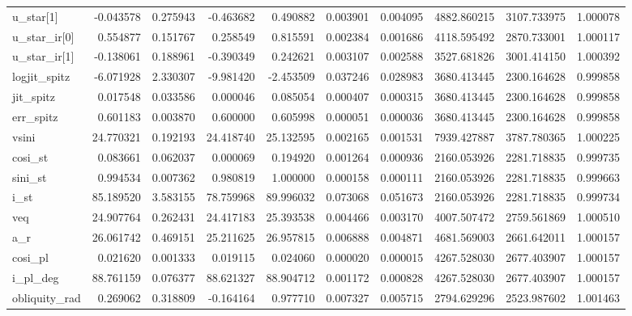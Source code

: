 \begin{tabular}{lrrrrrrrrr}
u\_star[1]     &   -0.043578 &   0.275943 &   -0.463682 &    0.490882 &   0.003901 &  0.004095 &  4882.860215 &  3107.733975 &  1.000078 \\
u\_star\_ir[0]  &    0.554877 &   0.151767 &    0.258549 &    0.815591 &   0.002384 &  0.001686 &  4118.595492 &  2870.733001 &  1.000117 \\
u\_star\_ir[1]  &   -0.138061 &   0.188961 &   -0.390349 &    0.242621 &   0.003107 &  0.002588 &  3527.681826 &  3001.414150 &  1.000392 \\
logjit\_spitz  &   -6.071928 &   2.330307 &   -9.981420 &   -2.453509 &   0.037246 &  0.028983 &  3680.413445 &  2300.164628 &  0.999858 \\
jit\_spitz     &    0.017548 &   0.033586 &    0.000046 &    0.085054 &   0.000407 &  0.000315 &  3680.413445 &  2300.164628 &  0.999858 \\
err\_spitz     &    0.601183 &   0.003870 &    0.600000 &    0.605998 &   0.000051 &  0.000036 &  3680.413445 &  2300.164628 &  0.999858 \\
vsini         &   24.770321 &   0.192193 &   24.418740 &   25.132595 &   0.002165 &  0.001531 &  7939.427887 &  3787.780365 &  1.000225 \\
cosi\_st       &    0.083661 &   0.062037 &    0.000069 &    0.194920 &   0.001264 &  0.000936 &  2160.053926 &  2281.718835 &  0.999735 \\
sini\_st       &    0.994534 &   0.007362 &    0.980819 &    1.000000 &   0.000158 &  0.000111 &  2160.053926 &  2281.718835 &  0.999663 \\
i\_st          &   85.189520 &   3.583155 &   78.759968 &   89.996032 &   0.073068 &  0.051673 &  2160.053926 &  2281.718835 &  0.999734 \\
veq           &   24.907764 &   0.262431 &   24.417183 &   25.393538 &   0.004466 &  0.003170 &  4007.507472 &  2759.561869 &  1.000510 \\
a\_r           &   26.061742 &   0.469151 &   25.211625 &   26.957815 &   0.006888 &  0.004871 &  4681.569003 &  2661.642011 &  1.000157 \\
cosi\_pl       &    0.021620 &   0.001333 &    0.019115 &    0.024060 &   0.000020 &  0.000015 &  4267.528030 &  2677.403907 &  1.000157 \\
i\_pl\_deg      &   88.761159 &   0.076377 &   88.621327 &   88.904712 &   0.001172 &  0.000828 &  4267.528030 &  2677.403907 &  1.000157 \\
obliquity\_rad &    0.269062 &   0.318809 &   -0.164164 &    0.977710 &   0.007327 &  0.005715 &  2794.629296 &  2523.987602 &  1.001463 \\

\end{tabular}
